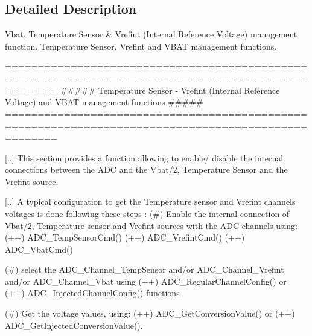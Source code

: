 \subsection{Detailed Description}
Vbat, Temperature Sensor \& Vrefint (Internal Reference Voltage) management function. Temperature Sensor, Vrefint and V\-B\-A\-T management functions.

\begin{DoxyVerb} ====================================================================================================
  ##### Temperature Sensor - Vrefint (Internal Reference Voltage) and VBAT management functions #####
 ====================================================================================================  

  [..] This section provides a function allowing to enable/ disable the internal 
  connections between the ADC and the Vbat/2, Temperature Sensor and the Vrefint source.

  [..] A typical configuration to get the Temperature sensor and Vrefint channels 
  voltages is done following these steps :
   (#) Enable the internal connection of Vbat/2, Temperature sensor and Vrefint sources 
       with the ADC channels using:
      (++) ADC_TempSensorCmd()  
      (++) ADC_VrefintCmd() 
      (++) ADC_VbatCmd()  

   (#) select the ADC_Channel_TempSensor and/or ADC_Channel_Vrefint and/or ADC_Channel_Vbat using 
      (++) ADC_RegularChannelConfig() or  
      (++) ADC_InjectedChannelConfig() functions 

   (#) Get the voltage values, using:
      (++) ADC_GetConversionValue() or  
      (++) ADC_GetInjectedConversionValue().\end{DoxyVerb}


